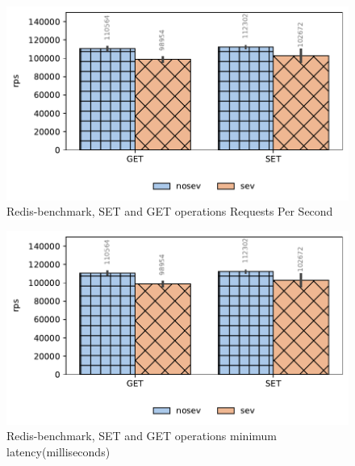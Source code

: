 \documentclass[twocolumn]{article}
\begin{document}
\begin{figure}[ht]
    \centering
    \includegraphics[width=\columnwidth]{img/redis.pdf}
    \caption{Redis-benchmark, SET and GET operations Requests Per Second}
    \label{fig:tb-redis}
\end{figure}

\begin{figure}[ht]
    \centering
    \includegraphics[width=\columnwidth]{img/redis.pdf}
    \caption{Redis-benchmark, SET and GET operations minimum latency(milliseconds)}
    \label{fig:tb-redis-latency}
\end{figure}
\end{document}
